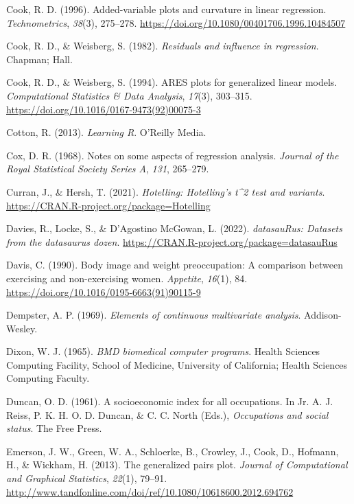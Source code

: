 \documentclass[
  letterpaper,
  10pt,
  krantz2]{krantz}
\newlength{\cslhangindent}
\newenvironment{CSLReferences}[2] %
 {\begin{list}{}{%
  \setlength{\itemindent}{0pt}
  \setlength{\leftmargin}{0pt}
  \setlength{\parsep}{0pt}
  \ifodd #1
   \setlength{\leftmargin}{\cslhangindent}
   \setlength{\itemindent}{-1\cslhangindent}
  \fi
  \setlength{\itemsep}{#2\baselineskip}}}
 {\end{list}}
\begin{document}
\begin{CSLReferences}{1}{0}
Cook, R. D. (1996). Added-variable plots and curvature in linear
regression. \emph{Technometrics}, \emph{38}(3), 275--278.
\url{https://doi.org/10.1080/00401706.1996.10484507}

Cook, R. D., \& Weisberg, S. (1982). \emph{Residuals and influence in
regression}. Chapman; Hall.

Cook, R. D., \& Weisberg, S. (1994). ARES plots for generalized linear
models. \emph{Computational Statistics \& Data Analysis}, \emph{17}(3),
303--315. \url{https://doi.org/10.1016/0167-9473(92)00075-3}

Cotton, R. (2013). \emph{{Learning R}}. O'Reilly Media.

Cox, D. R. (1968). Notes on some aspects of regression analysis.
\emph{Journal of the Royal Statistical Society Series A}, \emph{131},
265--279.

Curran, J., \& Hersh, T. (2021). \emph{Hotelling: Hotelling's t\^{}2
test and variants}. \url{https://CRAN.R-project.org/package=Hotelling}

Davies, R., Locke, S., \& D'Agostino McGowan, L. (2022).
\emph{datasauRus: Datasets from the datasaurus dozen}.
\url{https://CRAN.R-project.org/package=datasauRus}

Davis, C. (1990). Body image and weight preoccupation: A comparison
between exercising and non-exercising women. \emph{Appetite},
\emph{16}(1), 84. \url{https://doi.org/10.1016/0195-6663(91)90115-9}

Dempster, A. P. (1969). \emph{Elements of continuous multivariate
analysis}. Addison-Wesley.

Dixon, W. J. (1965). \emph{BMD biomedical computer programs}. Health
Sciences Computing Facility, School of Medicine, University of
California; Health Sciences Computing Faculty.

Duncan, O. D. (1961). A socioeconomic index for all occupations. In Jr.
A. J. Reiss, P. K. H. O. D. Duncan, \& C. C. North (Eds.),
\emph{Occupations and social status}. The Free Press.

Emerson, J. W., Green, W. A., Schloerke, B., Crowley, J., Cook, D.,
Hofmann, H., \& Wickham, H. (2013). The generalized pairs plot.
\emph{Journal of Computational and Graphical Statistics}, \emph{22}(1),
79--91.
\url{http://www.tandfonline.com/doi/ref/10.1080/10618600.2012.694762}


\end{CSLReferences}
\end{document}
